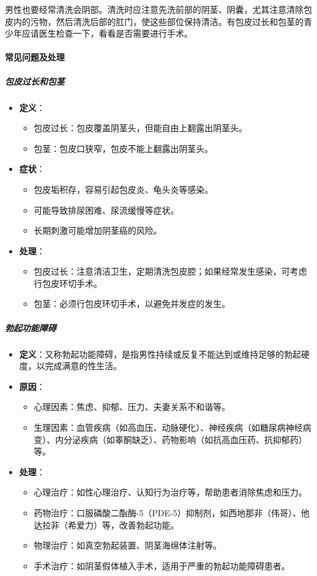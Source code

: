 男性也要经常清洗会阴部。清洗时应注意先洗前部的阴茎、阴囊，尤其注意清除包皮内的污物，然后清洗后部的肛门，使这些部位保持清洁。有包皮过长和包茎的青少年应请医生检查一下，看看是否需要进行手术。

\paragraph{常见问题及处理}

\subparagraph{包皮过长和包茎}
\begin{itemize}
\item \textbf{定义}：
  \begin{itemize}
  \item 包皮过长：包皮覆盖阴茎头，但能自由上翻露出阴茎头。
  \item 包茎：包皮口狭窄，包皮不能上翻露出阴茎头。
  \end{itemize}
\item \textbf{症状}：
  \begin{itemize}
  \item 包皮垢积存，容易引起包皮炎、龟头炎等感染。
  \item 可能导致排尿困难、尿流缓慢等症状。
  \item 长期刺激可能增加阴茎癌的风险。
  \end{itemize}
\item \textbf{处理}：
  \begin{itemize}
  \item 包皮过长：注意清洁卫生，定期清洗包皮腔；如果经常发生感染，可考虑行包皮环切手术。
  \item 包茎：必须行包皮环切手术，以避免并发症的发生。
  \end{itemize}
\end{itemize}

\subparagraph{勃起功能障碍}
\begin{itemize}
\item \textbf{定义}：又称勃起功能障碍，是指男性持续或反复不能达到或维持足够的勃起硬度，以完成满意的性生活。
\item \textbf{原因}：
  \begin{itemize}
  \item 心理因素：焦虑、抑郁、压力、夫妻关系不和谐等。
  \item 生理因素：血管疾病（如高血压、动脉硬化）、神经疾病（如糖尿病神经病变）、内分泌疾病（如睾酮缺乏）、药物影响（如抗高血压药、抗抑郁药）等。
  \end{itemize}
\item \textbf{处理}：
  \begin{itemize}
  \item 心理治疗：如性心理治疗、认知行为治疗等，帮助患者消除焦虑和压力。
  \item 药物治疗：口服磷酸二酯酶-5（PDE-5）抑制剂，如西地那非（伟哥）、他达拉非（希爱力）等，改善勃起功能。
  \item 物理治疗：如真空勃起装置、阴茎海绵体注射等。
  \item 手术治疗：如阴茎假体植入手术，适用于严重的勃起功能障碍患者。
  \end{itemize}
\end{itemize}

